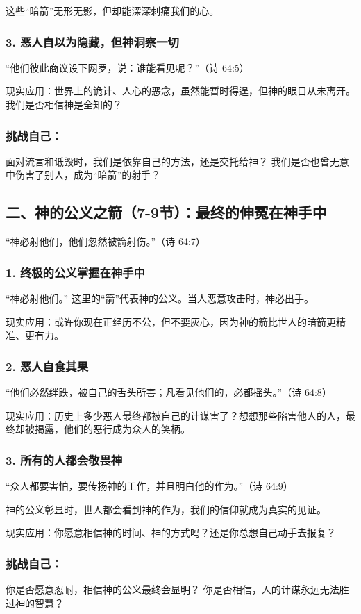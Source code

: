\documentclass[a4paper, 12pt]{article}
\begin{document}
这些“暗箭”无形无影，但却能深深刺痛我们的心。
\subsubsection*{3. 恶人自以为隐藏，但神洞察一切}
“他们彼此商议设下网罗，说：谁能看见呢？”（诗 64:5）

现实应用：世界上的诡计、人心的恶念，虽然能暂时得逞，但神的眼目从未离开。我们是否相信神是全知的？

\subsubsection*{挑战自己：}
面对流言和诋毁时，我们是依靠自己的方法，还是交托给神？
我们是否也曾无意中伤害了别人，成为“暗箭”的射手？
\subsection*{二、神的公义之箭（7-9节）：最终的伸冤在神手中}
“神必射他们，他们忽然被箭射伤。”（诗 64:7）

\subsubsection*{1. 终极的公义掌握在神手中}
“神必射他们。” 这里的“箭”代表神的公义。当人恶意攻击时，神必出手。

现实应用：或许你现在正经历不公，但不要灰心，因为神的箭比世人的暗箭更精准、更有力。
\subsubsection*{2. 恶人自食其果}
“他们必然绊跌，被自己的舌头所害；凡看见他们的，必都摇头。”（诗 64:8）

现实应用：历史上多少恶人最终都被自己的计谋害了？想想那些陷害他人的人，最终却被揭露，他们的恶行成为众人的笑柄。
\subsubsection*{3. 所有的人都会敬畏神}
“众人都要害怕，要传扬神的工作，并且明白他的作为。”（诗 64:9）

神的公义彰显时，世人都会看到神的作为，我们的信仰就成为真实的见证。

现实应用：你愿意相信神的时间、神的方式吗？还是你总想自己动手去报复？
\subsubsection*{挑战自己：}
你是否愿意忍耐，相信神的公义最终会显明？
你是否相信，人的计谋永远无法胜过神的智慧？
\end{document}
